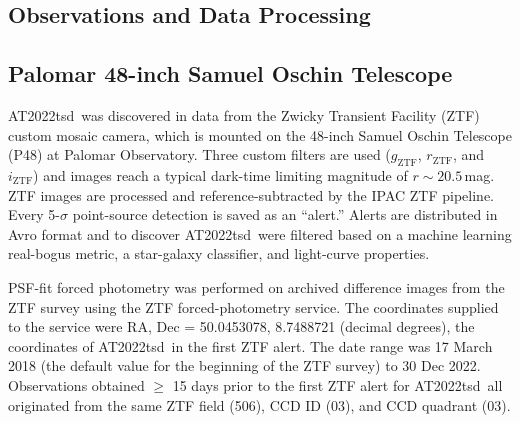 \documentclass{nature_plusfigure}
\newcommand{\at}{AT2022tsd}
\begin{document}
\begin{methods}
\section{Observations and Data Processing}

\subsection{Palomar 48-inch Samuel Oschin Telescope}
\label{sec:p48}

\at\ was discovered in data from the Zwicky Transient Facility (ZTF) custom mosaic camera\cite{Dekany2020}, which is mounted on the 48-inch Samuel Oschin Telescope (P48) at Palomar Observatory.
Three custom filters are used ($g_{\mathrm{ZTF}}$, $r_{\mathrm{ZTF}}$, and $i_{\mathrm{ZTF}}$\cite{Dekany2020})
and images reach a typical dark-time limiting magnitude of $r\sim20.5\,$mag.
ZTF images are processed and reference-subtracted
by the IPAC ZTF pipeline\cite{Masci2019}.
Every 5-$\sigma$ point-source detection is saved as an ``alert.''
Alerts are distributed in Avro format\cite{Patterson2019} and to discover \at\ were filtered based on a machine learning real-bogus metric\cite{Duev2019}, a star-galaxy classifier\cite{Tachibana2018}, and light-curve properties.

PSF-fit forced photometry was performed on archived difference images from the ZTF survey using the ZTF forced-photometry service\cite{Masci2019}. The coordinates supplied to the service were RA, Dec = 50.0453078, 8.7488721 (decimal degrees), the coordinates of \at\ in the first ZTF alert. The date range was 17 March 2018 (the default value for the beginning of the ZTF survey) to 30 Dec 2022.
Observations obtained $\geq$ 15 days prior to the first ZTF alert for \at\ all originated from the same ZTF field (506), CCD ID (03), and CCD quadrant (03). 


\end{methods}
\end{document}
